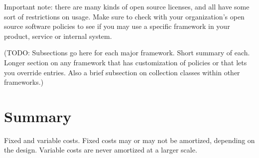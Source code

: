 Important note: there are many kinds of open source licenses, and all have some
sort of restrictions on usage. Make sure to check with your organization's open
source software policies to see if you may use a specific framework in 
your product, service or internal system.

(TODO: Subsections go here for each major framework. Short summary of each.
Longer section on any framework that has customization of policies or that lets you override
entries. Also a brief subsection on collection classes within other frameworks.)

\section{Summary}

Fixed and variable costs.  Fixed costs may or may not be amortized, depending on
the design.  Variable costs are never amortized at a larger scale.

